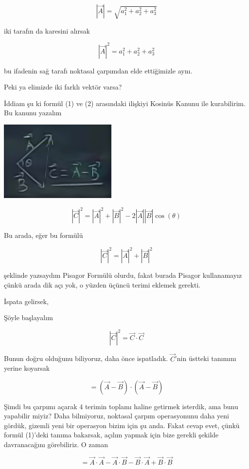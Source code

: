 \documentclass[12pt,fleqn]{article}\usepackage{../../common}
\begin{document}
$$ |\vec{A}| = \sqrt{a_1 ^2 + a_2^2 + a_3^2} $$

iki tarafın da karesini alırsak

$$ |\vec{A}|^2 = a_1 ^2 + a_2^2 + a_3^2$$

bu ifadenin sağ tarafı noktasal çarpımdan elde ettiğimizle aynı. 

Peki ya elimizde iki farklı vektör varsa? 

İddiam şu ki formül (1) ve (2) arasındaki ilişkiyi Kosinüs Kanunu ile
kurabilirim. Bu kanunu yazalım

\begin{center}
\includegraphics[height=4cm]{1_11.png}
\end{center}

$$ |\vec{C}|^2 = |\vec{A}|^2 + |\vec{B}|^2 - 2|\vec{A}||\vec{B}|\cos(\theta) $$

Bu arada, eğer bu formülü 

$$ |\vec{C}|^2 = |\vec{A}|^2 + |\vec{B}|^2  $$

şeklinde yazsaydım Pisagor Formülü olurdu, fakat burada Pisagor kullanamayız
çünkü arada dik açı yok, o yüzden üçüncü terimi eklemek gerekti.

İspata gelirsek,

Şöyle başlayalım

$$ |\vec{C}|^2 = \vec{C} \cdot \vec{C} $$

Bunun doğru olduğunu biliyoruz, daha önce ispatladık. $\vec{C}$'nin
üstteki tanımını yerine koyarsak

$$ = (\vec{A} - \vec{B}) \cdot (\vec{A} - \vec{B})  $$

Şimdi bu çarpımı açarak 4 terimin toplamı haline getirmek isterdik, ama bunu
yapabilir miyiz? Daha bilmiyoruz, noktasal çarpım operasyonunu daha yeni gördük,
gizemli yeni bir operasyon bizim için şu anda. Fakat cevap evet, çünkü formül
(1)'deki tanıma bakarsak, açılım yapmak için bize gerekli şekilde davranacağını
görebiliriz. O zaman

$$  =
\vec{A}\cdot\vec{A} - 
\vec{A}\cdot\vec{B} -
\vec{B}\cdot\vec{A} +
\vec{B}\cdot\vec{B} 
$$
\end{document}
